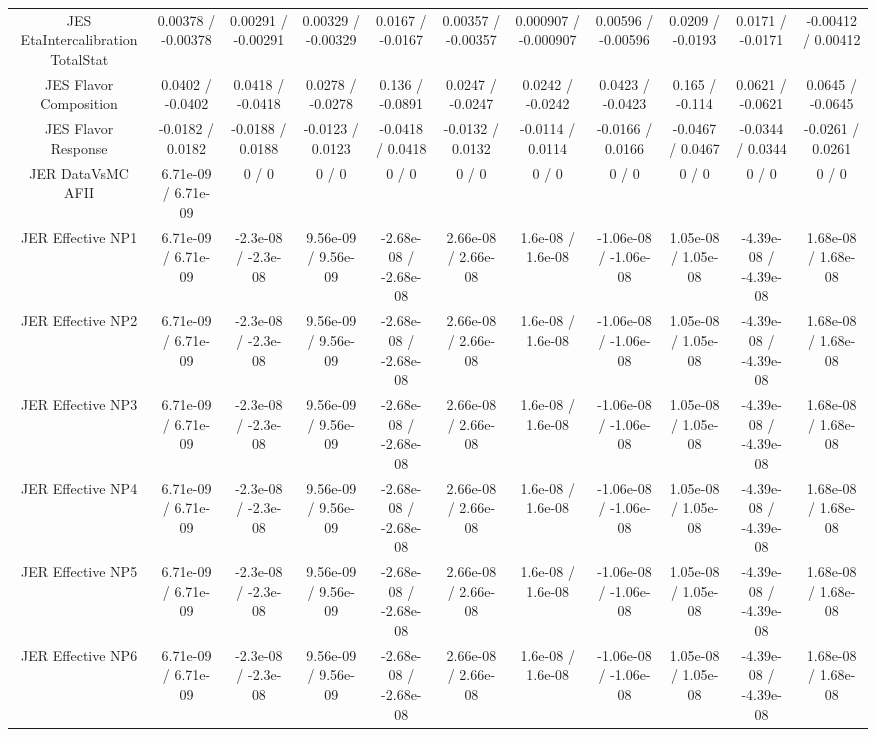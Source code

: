 \begin{table}[htbp]
\begin{center}
\begin{tabular}{|c|c|c|c|c|c|c|c|c|c|c|}
  JES EtaIntercalibration TotalStat & 0.00378 / -0.00378 & 0.00291 / -0.00291 & 0.00329 / -0.00329 & 0.0167 / -0.0167 & 0.00357 / -0.00357 & 0.000907 / -0.000907 & 0.00596 / -0.00596 & 0.0209 / -0.0193 & 0.0171 / -0.0171 & -0.00412 / 0.00412 \\ 
  JES Flavor Composition & 0.0402 / -0.0402 & 0.0418 / -0.0418 & 0.0278 / -0.0278 & 0.136 / -0.0891 & 0.0247 / -0.0247 & 0.0242 / -0.0242 & 0.0423 / -0.0423 & 0.165 / -0.114 & 0.0621 / -0.0621 & 0.0645 / -0.0645 \\ 
  JES Flavor Response & -0.0182 / 0.0182 & -0.0188 / 0.0188 & -0.0123 / 0.0123 & -0.0418 / 0.0418 & -0.0132 / 0.0132 & -0.0114 / 0.0114 & -0.0166 / 0.0166 & -0.0467 / 0.0467 & -0.0344 / 0.0344 & -0.0261 / 0.0261 \\ 
  JER DataVsMC AFII & 6.71e-09 / 6.71e-09 & 0 / 0 & 0 / 0 & 0 / 0 & 0 / 0 & 0 / 0 & 0 / 0 & 0 / 0 & 0 / 0 & 0 / 0 \\ 
  JER Effective NP1 & 6.71e-09 / 6.71e-09 & -2.3e-08 / -2.3e-08 & 9.56e-09 / 9.56e-09 & -2.68e-08 / -2.68e-08 & 2.66e-08 / 2.66e-08 & 1.6e-08 / 1.6e-08 & -1.06e-08 / -1.06e-08 & 1.05e-08 / 1.05e-08 & -4.39e-08 / -4.39e-08 & 1.68e-08 / 1.68e-08 \\ 
  JER Effective NP2 & 6.71e-09 / 6.71e-09 & -2.3e-08 / -2.3e-08 & 9.56e-09 / 9.56e-09 & -2.68e-08 / -2.68e-08 & 2.66e-08 / 2.66e-08 & 1.6e-08 / 1.6e-08 & -1.06e-08 / -1.06e-08 & 1.05e-08 / 1.05e-08 & -4.39e-08 / -4.39e-08 & 1.68e-08 / 1.68e-08 \\ 
  JER Effective NP3 & 6.71e-09 / 6.71e-09 & -2.3e-08 / -2.3e-08 & 9.56e-09 / 9.56e-09 & -2.68e-08 / -2.68e-08 & 2.66e-08 / 2.66e-08 & 1.6e-08 / 1.6e-08 & -1.06e-08 / -1.06e-08 & 1.05e-08 / 1.05e-08 & -4.39e-08 / -4.39e-08 & 1.68e-08 / 1.68e-08 \\ 
  JER Effective NP4 & 6.71e-09 / 6.71e-09 & -2.3e-08 / -2.3e-08 & 9.56e-09 / 9.56e-09 & -2.68e-08 / -2.68e-08 & 2.66e-08 / 2.66e-08 & 1.6e-08 / 1.6e-08 & -1.06e-08 / -1.06e-08 & 1.05e-08 / 1.05e-08 & -4.39e-08 / -4.39e-08 & 1.68e-08 / 1.68e-08 \\ 
  JER Effective NP5 & 6.71e-09 / 6.71e-09 & -2.3e-08 / -2.3e-08 & 9.56e-09 / 9.56e-09 & -2.68e-08 / -2.68e-08 & 2.66e-08 / 2.66e-08 & 1.6e-08 / 1.6e-08 & -1.06e-08 / -1.06e-08 & 1.05e-08 / 1.05e-08 & -4.39e-08 / -4.39e-08 & 1.68e-08 / 1.68e-08 \\ 
  JER Effective NP6 & 6.71e-09 / 6.71e-09 & -2.3e-08 / -2.3e-08 & 9.56e-09 / 9.56e-09 & -2.68e-08 / -2.68e-08 & 2.66e-08 / 2.66e-08 & 1.6e-08 / 1.6e-08 & -1.06e-08 / -1.06e-08 & 1.05e-08 / 1.05e-08 & -4.39e-08 / -4.39e-08 & 1.68e-08 / 1.68e-08 \\ 

\end{tabular}
\end{center}
\end{table}
